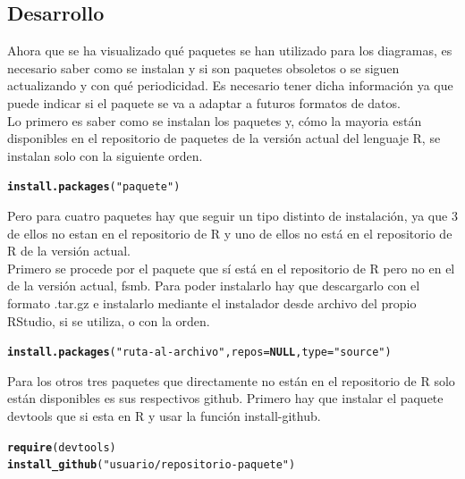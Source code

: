 \documentclass{article}\usepackage[]{graphicx}\usepackage[]{color}
\makeatletter
\newcommand{\hlstr}[1]{\textcolor[rgb]{0.192,0.494,0.8}{#1}}%
\newcommand{\hlstd}[1]{\textcolor[rgb]{0.345,0.345,0.345}{#1}}%
\newcommand{\hlkwa}[1]{\textcolor[rgb]{0.161,0.373,0.58}{\textbf{#1}}}%
\newcommand{\hlkwc}[1]{\textcolor[rgb]{0.333,0.667,0.333}{#1}}%
\newcommand{\hlkwd}[1]{\textcolor[rgb]{0.737,0.353,0.396}{\textbf{#1}}}%
\newenvironment{kframe}{%
 \def\at@end@of@kframe{}%
 \ifinner\ifhmode%
  \def\at@end@of@kframe{\end{minipage}}%
  \begin{minipage}{\columnwidth}%
 \fi\fi%
 \def\FrameCommand##1{\hskip\@totalleftmargin \hskip-\fboxsep
 \colorbox{shadecolor}{##1}\hskip-\fboxsep
     \hskip-\linewidth \hskip-\@totalleftmargin \hskip\columnwidth}%
 \MakeFramed {\advance\hsize-\width
   \@totalleftmargin\z@ \linewidth\hsize
   \@setminipage}}%
 {\par\unskip\endMakeFramed%
 \at@end@of@kframe}
\newenvironment{knitrout}{}{} %
\makeatother
\begin{document}
\subsection{Desarrollo}
Ahora que se ha visualizado qu\'e paquetes se han utilizado para los diagramas, es necesario saber como se instalan y si son paquetes obsoletos o se siguen actualizando y con qu\'e periodicidad. Es necesario tener dicha informaci\'on ya que puede indicar si el paquete se va a adaptar a futuros formatos de datos.~\\
Lo primero es saber como se instalan los paquetes y, c\'omo la mayoria est\'an disponibles en el repositorio de paquetes de la versi\'on actual del lenguaje R, se instalan solo con la siguiente orden.
\begin{knitrout}
\color{fgcolor}\begin{kframe}
\begin{alltt}
\hlkwd{install.packages}\hlstd{(}\hlstr{"paquete"}\hlstd{)}
\end{alltt}
\end{kframe}
\end{knitrout}
Pero para cuatro paquetes hay que seguir un tipo distinto de instalaci\'on, ya que 3 de ellos no estan en el repositorio de R y uno de ellos no est\'a en el repositorio de R de la versi\'on actual.~\\
Primero se procede por el paquete que s\'i est\'a en el repositorio de R pero no en el de la versi\'on actual, fsmb. Para poder instalarlo hay que descargarlo con el formato .tar.gz e instalarlo mediante el instalador desde archivo del propio RStudio, si se utiliza, o con la orden.
\begin{knitrout}
\color{fgcolor}\begin{kframe}
\begin{alltt}
\hlkwd{install.packages}\hlstd{(}\hlstr{"ruta-al-archivo"}\hlstd{,} \hlkwc{repos} \hlstd{=} \hlkwa{NULL}\hlstd{,} \hlkwc{type}\hlstd{=}\hlstr{"source"}\hlstd{)}
\end{alltt}
\end{kframe}
\end{knitrout}
\clearpage
Para los otros tres paquetes que directamente no est\'an en el repositorio de R solo est\'an disponibles es sus respectivos github. Primero hay que instalar el paquete devtools que si esta en R y usar la funci\'on install-github.
\begin{knitrout}
\color{fgcolor}\begin{kframe}
\begin{alltt}
\hlkwd{require}\hlstd{(devtools)}
\hlkwd{install_github}\hlstd{(}\hlstr{"usuario/repositorio-paquete"}\hlstd{)}
\end{alltt}
\end{kframe}
\end{knitrout}
\end{document}
